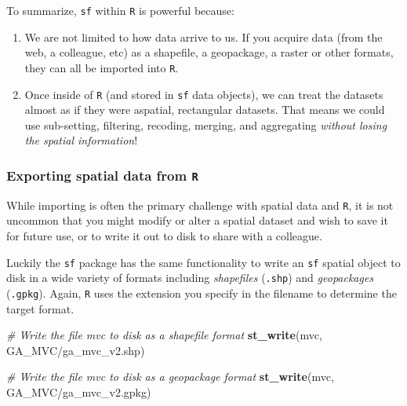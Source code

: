 \documentclass[
]{book}
\newenvironment{Shaded}{\begin{snugshade}}{\end{snugshade}}
\newcommand{\CommentTok}[1]{\textcolor[rgb]{0.56,0.35,0.01}{\textit{#1}}}
\newcommand{\FunctionTok}[1]{\textcolor[rgb]{0.13,0.29,0.53}{\textbf{#1}}}
\newcommand{\NormalTok}[1]{#1}
\newcommand{\StringTok}[1]{\textcolor[rgb]{0.31,0.60,0.02}{#1}}
\providecommand{\tightlist}{%
  \setlength{\itemsep}{0pt}\setlength{\parskip}{0pt}}
\newenvironment{rmdnote}[1]
  {
  \begin{itemize}
  \renewcommand{\labelitemi}{
    \raisebox{-.7\height}[0pt][0pt]{
      {\setkeys{Gin}{width=3em,keepaspectratio}\texttt{[image: images/\#1]}}
    }
  }
  \setlength{\fboxsep}{1em}
  \begin{note}
  \item
  }
  {
  \end{note}
  \end{itemize}
  }
\begin{document}
\begin{rmdnote}{note}

To summarize, \texttt{sf} within \texttt{R} is powerful because:

\begin{enumerate}
\def\labelenumi{\arabic{enumi}.}
\tightlist
\item
  We are not limited to how data arrive to us. If you acquire data (from the web, a colleague, etc) as a shapefile, a geopackage, a raster or other formats, they can all be imported into \texttt{R}.
\item
  Once inside of \texttt{R} (and stored in \texttt{sf} data objects), we can treat the datasets almost as if they were aspatial, rectangular datasets. That means we could use sub-setting, filtering, recoding, merging, and aggregating \emph{without losing the spatial information}!
\end{enumerate}

\end{rmdnote}

\hypertarget{exporting-spatial-data-from-r}{%
\subsubsection{\texorpdfstring{Exporting spatial data from \texttt{R}}{Exporting spatial data from R}}\label{exporting-spatial-data-from-r}}

While importing is often the primary challenge with spatial data and \texttt{R}, it is not uncommon that you might modify or alter a spatial dataset and wish to save it for future use, or to write it out to disk to share with a colleague.

Luckily the \texttt{sf} package has the same functionality to write an \texttt{sf} spatial object to disk in a wide variety of formats including \emph{shapefiles} (\texttt{.shp}) and \emph{geopackages} (\texttt{.gpkg}). Again, \texttt{R} uses the extension you specify in the filename to determine the target format.

\begin{Shaded}
\begin{Highlighting}[]
\CommentTok{\# Write the file mvc to disk as a shapefile format}
\FunctionTok{st\_write}\NormalTok{(mvc, }\StringTok{\textquotesingle{}GA\_MVC/ga\_mvc\_v2.shp\textquotesingle{}}\NormalTok{)}

\CommentTok{\# Write the file mvc to disk as a geopackage format}
\FunctionTok{st\_write}\NormalTok{(mvc, }\StringTok{\textquotesingle{}GA\_MVC/ga\_mvc\_v2.gpkg\textquotesingle{}}\NormalTok{)}
\end{Highlighting}
\end{Shaded}
\end{document}
